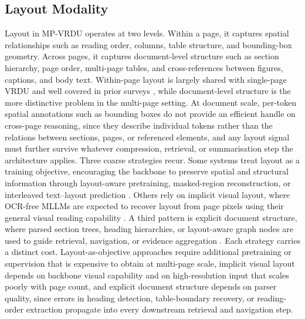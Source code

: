 \documentclass[11pt]{article}
\begin{document}
\subsection{Layout Modality}
Layout in MP-VRDU operates at two levels. Within a page, it captures spatial relationships such as reading order, columns, table structure, and bounding-box geometry. Across pages, it captures document-level structure such as section hierarchy, page order, multi-page tables, and cross-references between figures, captions, and body text. Within-page layout is largely shared with single-page VRDU and well covered in prior surveys \cite{ding2025survey}, while document-level structure is the more distinctive problem in the multi-page setting. At document scale, per-token spatial annotations such as bounding boxes do not provide an efficient handle on cross-page reasoning, since they describe individual tokens rather than the relations between sections, pages, or referenced elements, and any layout signal must further survive whatever compression, retrieval, or summarisation  step the architecture applies. Three coarse strategies recur. Some systems treat layout as a training objective, encouraging the backbone to preserve spatial and structural information through layout-aware pretraining, masked-region reconstruction, or interleaved text--layout prediction \cite{tito2023hierarchical, hu2025mplug, zhu2025simple}. Others rely on implicit visual layout, where OCR-free MLLMs are expected to recover layout from page pixels using their general visual reading capability \cite{yu2024texthawk2, hu2025mplug}. A third pattern is explicit document structure, where parsed section trees, heading hierarchies, or layout-aware  graph nodes are used to guide retrieval, navigation, or evidence aggregation \cite{shin2025multidocfusion, gong2025mhier, zhang2026mldocrag, wang2024knowledge}. Each strategy carries a distinct cost. Layout-as-objective approaches require additional pretraining or supervision that is expensive to obtain at multi-page scale, implicit visual layout depends on backbone visual capability and on high-resolution input that scales poorly with page count, and explicit document structure depends on parser quality, since errors in heading detection, table-boundary recovery, or reading-order extraction propagate into every downstream retrieval and navigation step.
\end{document}
